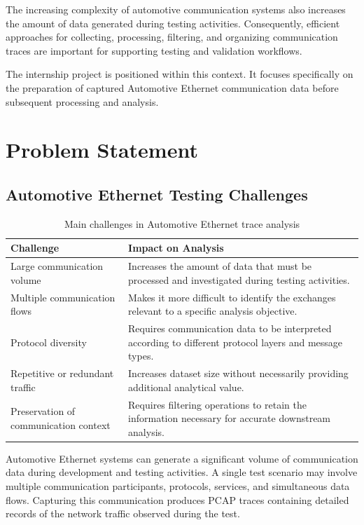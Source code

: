 The increasing complexity of automotive communication systems also increases the amount of data generated during testing activities. Consequently, efficient approaches for collecting, processing, filtering, and organizing communication traces are important for supporting testing and validation workflows.

The internship project is positioned within this context. It focuses specifically on the preparation of captured Automotive Ethernet communication data before subsequent processing and analysis.

\section{Problem Statement}

\subsection{Automotive Ethernet Testing Challenges}
\begin{table}[H]
\centering
\caption{Main challenges in Automotive Ethernet trace analysis}
\label{tab:testing_challenges}

\begin{tabular}{p{} p{}}
\toprule
\textbf{Challenge} & \textbf{Impact on Analysis} \\
\midrule

Large communication volume &
Increases the amount of data that must be processed and investigated during testing activities. \\

Multiple communication flows &
Makes it more difficult to identify the exchanges relevant to a specific analysis objective. \\

Protocol diversity &
Requires communication data to be interpreted according to different protocol layers and message types. \\

Repetitive or redundant traffic &
Increases dataset size without necessarily providing additional analytical value. \\

Preservation of communication context &
Requires filtering operations to retain the information necessary for accurate downstream analysis. \\

\bottomrule
\end{tabular}
\end{table}
Automotive Ethernet systems can generate a significant volume of communication data during development and testing activities. A single test scenario may involve multiple communication participants, protocols, services, and simultaneous data flows. Capturing this communication produces PCAP traces containing detailed records of the network traffic observed during the test.

